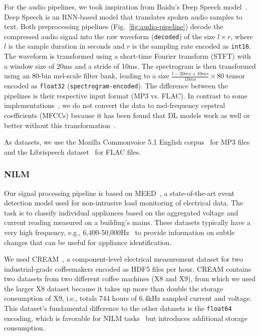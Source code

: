 For the audio pipelines, we took inspiration from Baidu's Deep Speech model~\cite{hannun2014deep, amodei2016deep}.
Deep Speech is an RNN-based model that translates spoken audio samples to text.
Both preprocessing pipelines (Fig.~\ref{fig:audio-pipeline}) decode the compressed audio signal into the raw waveform ({\color{diff}\texttt{decoded}}) of the size $l \times r$, where $l$ is the sample duration in seconds and $r$ is the sampling rate encoded as \texttt{int16}.
The waveform is transformed using a short-time Fourier transform (STFT) with a window size of 20\:ms and a stride of 10\:ms.
The spectrogram is then transformed using an 80-bin mel-scale filter bank, leading to a size $\frac{l - 20ms + 10ms}{10ms} \times 80$ tensor encoded as \texttt{float32} ({\color{diff}\texttt{spectrogram-encoded}}).
The difference between the pipelines is their respective input format (MP3 vs. FLAC).
In contrast to some implementations~\cite{hannun2014deep}, we do not convert the data to mel-frequency cepstral coefficients (MFCCs) because it has been found that DL models work as well or better without this transformation~\cite{huzaifah2017comparison, purwins2019deep, solovyev2020deep}.

As datasets, we use the Mozilla Commonvoice 5.1 English corpus~\cite{ardila2019common} for MP3 files and the Librispeech dataset~\cite{panayotov2015librispeech} for FLAC files.

\subsubsection{NILM}

Our signal processing pipeline is based on MEED~\cite{jorde2019meed}, a state-of-the-art event detection model used for non-intrusive load monitoring of electrical data.
The task is to classify individual appliances based on the aggregated voltage and current reading measured on a building's mains.
These datasets typically have a very high frequency, e.g., 6,400-50,000\;Hz~\cite{anderson2012blued, kriechbaumer2018blond, jorde2020cream} to provide information on subtle changes that can be useful for appliance identification.

We used CREAM~\cite{jorde2020cream}, a component-level electrical measurement dataset for two industrial-grade coffeemakers encoded as HDF5 files per hour.
CREAM contains two datasets from two different coffee machines (X8 and X9), from which we used the larger X8 dataset because it takes up more than double the storage consumption of X9, i.e., totals 744 hours of 6.4\:kHz sampled current and voltage.
This dataset's fundamental difference to the other datasets is the \texttt{float64} encoding, which is favorable for NILM tasks~\cite{kahl2017comprehensive} but introduces additional storage consumption.

